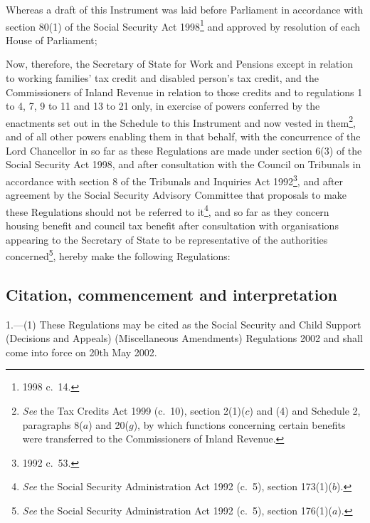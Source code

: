 \documentclass[12pt,a4paper]{article}
\title{\regstitle}
\author{S.I.\ 2002 No.\ 1379}
\date{Made
15th May 2002\\
Coming into force
20th May 2002
}
\begin{document}
\maketitle

\noindent
Whereas a draft of this Instrument was laid before Parliament in accordance with section 80(1) of the Social Security Act 1998\footnote{1998 c.\ 14.} and approved by resolution of each House of Parliament;

Now, therefore, the Secretary of State for Work and Pensions except in relation to working families' tax credit and disabled person’s tax credit, and the Commissioners of Inland Revenue in relation to those credits and to regulations 1 to 4, 7, 9 to 11 and 13 to 21 only, in exercise of powers conferred by the enactments set out in the Schedule to this Instrument and now vested in them\footnote{\emph{See} the Tax Credits Act 1999 (c.\ 10), section 2(1)($c$)  and (4) and Schedule 2, paragraphs 8($a$)  and 20($g$), by which functions concerning certain benefits were transferred to the Commissioners of Inland Revenue.}, and of all other powers enabling them in that behalf, with the concurrence of the Lord Chancellor in so far as these Regulations are made under section 6(3) of the Social Security Act 1998, and after consultation with the Council on Tribunals in accordance with section 8 of the Tribunals and Inquiries Act 1992\footnote{1992 c.\ 53.}, and after agreement by the Social Security Advisory Committee that proposals to make these Regulations should not be referred to it\footnote{\emph{See} the Social Security Administration Act 1992 (c.\ 5), section 173(1)($b$).}, and so far as they concern housing benefit and council tax benefit after consultation with organisations appearing to the Secretary of State to be representative of the authorities concerned\footnote{\emph{See} the Social Security Administration Act 1992 (c.\ 5), section 176(1)($a$).}, hereby make the following Regulations: 

{\sloppy

\tableofcontents

}

\bigskip

\setcounter{secnumdepth}{-2}

\subsection[1. Citation, commencement and interpretation]{Citation, commencement and interpretation}

1.---(1)  These Regulations may be cited as the Social Security and Child Support (Decisions and Appeals) (Miscellaneous Amendments) Regulations 2002 and shall come into force on 20th May 2002.
\end{document}
